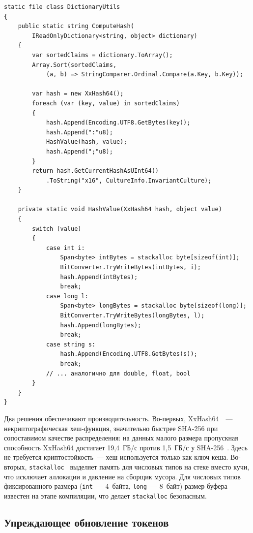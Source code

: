 \begin{lstlisting}[language={[Sharp]C}]
static file class DictionaryUtils
{
    public static string ComputeHash(
        IReadOnlyDictionary<string, object> dictionary)
    {
        var sortedClaims = dictionary.ToArray();
        Array.Sort(sortedClaims,
            (a, b) => StringComparer.Ordinal.Compare(a.Key, b.Key));

        var hash = new XxHash64();
        foreach (var (key, value) in sortedClaims)
        {
            hash.Append(Encoding.UTF8.GetBytes(key));
            hash.Append(":"u8);
            HashValue(hash, value);
            hash.Append(";"u8);
        }
        return hash.GetCurrentHashAsUInt64()
            .ToString("x16", CultureInfo.InvariantCulture);
    }

    private static void HashValue(XxHash64 hash, object value)
    {
        switch (value)
        {
            case int i:
                Span<byte> intBytes = stackalloc byte[sizeof(int)];
                BitConverter.TryWriteBytes(intBytes, i);
                hash.Append(intBytes);
                break;
            case long l:
                Span<byte> longBytes = stackalloc byte[sizeof(long)];
                BitConverter.TryWriteBytes(longBytes, l);
                hash.Append(longBytes);
                break;
            case string s:
                hash.Append(Encoding.UTF8.GetBytes(s));
                break;
            // ... аналогично для double, float, bool
        }
    }
}
\end{lstlisting}

Два решения обеспечивают производительность.
Во-первых, XxHash64~\cite{xxHash}~--- некриптографическая хеш-функция,
значительно быстрее SHA-256 при сопоставимом качестве распределения:
на данных малого размера пропускная способность XxHash64
достигает 19,4~ГБ/с против 1,5~ГБ/с у SHA-256~\cite{xxHash}.
Здесь не требуется криптостойкость~---
хеш используется только как ключ кеша.
Во-вторых, \texttt{stackalloc}~\cite{DotNetStackalloc} выделяет память
для числовых типов на стеке вместо кучи,
что исключает аллокации и давление на сборщик мусора.
Для числовых типов фиксированного размера
(\texttt{int}~--- 4~байта, \texttt{long}~--- 8~байт)
размер буфера известен на этапе компиляции,
что делает \texttt{stackalloc} безопасным.

\subsection{Упреждающее обновление токенов}\label{subsec:buffer-time}

